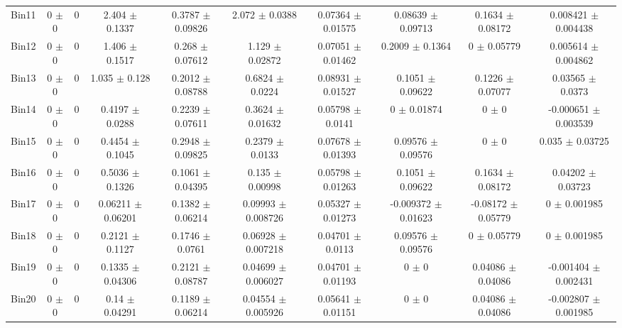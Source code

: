 \begin{tabular}{@{\extracolsep{4pt}}lccccccccc@{}}
     Bin11 & 0 $\pm$ 0 & 0 & 2.404 $\pm$ 0.1337 & 0.3787 $\pm$ 0.09826 & 2.072 $\pm$ 0.0388 & 0.07364 $\pm$ 0.01575 & 0.08639 $\pm$ 0.09713 & 0.1634 $\pm$ 0.08172 & 0.008421 $\pm$ 0.004438 \\ 
     Bin12 & 0 $\pm$ 0 & 0 & 1.406 $\pm$ 0.1517 & 0.268 $\pm$ 0.07612 & 1.129 $\pm$ 0.02872 & 0.07051 $\pm$ 0.01462 & 0.2009 $\pm$ 0.1364 & 0 $\pm$ 0.05779 & 0.005614 $\pm$ 0.004862 \\ 
     Bin13 & 0 $\pm$ 0 & 0 & 1.035 $\pm$ 0.128 & 0.2012 $\pm$ 0.08788 & 0.6824 $\pm$ 0.0224 & 0.08931 $\pm$ 0.01527 & 0.1051 $\pm$ 0.09622 & 0.1226 $\pm$ 0.07077 & 0.03565 $\pm$ 0.0373 \\ 
     Bin14 & 0 $\pm$ 0 & 0 & 0.4197 $\pm$ 0.0288 & 0.2239 $\pm$ 0.07611 & 0.3624 $\pm$ 0.01632 & 0.05798 $\pm$ 0.0141 & 0 $\pm$ 0.01874 & 0 $\pm$ 0 & -0.000651 $\pm$ 0.003539 \\ 
     Bin15 & 0 $\pm$ 0 & 0 & 0.4454 $\pm$ 0.1045 & 0.2948 $\pm$ 0.09825 & 0.2379 $\pm$ 0.0133 & 0.07678 $\pm$ 0.01393 & 0.09576 $\pm$ 0.09576 & 0 $\pm$ 0 & 0.035 $\pm$ 0.03725 \\ 
     Bin16 & 0 $\pm$ 0 & 0 & 0.5036 $\pm$ 0.1326 & 0.1061 $\pm$ 0.04395 & 0.135 $\pm$ 0.00998 & 0.05798 $\pm$ 0.01263 & 0.1051 $\pm$ 0.09622 & 0.1634 $\pm$ 0.08172 & 0.04202 $\pm$ 0.03723 \\ 
     Bin17 & 0 $\pm$ 0 & 0 & 0.06211 $\pm$ 0.06201 & 0.1382 $\pm$ 0.06214 & 0.09993 $\pm$ 0.008726 & 0.05327 $\pm$ 0.01273 & -0.009372 $\pm$ 0.01623 & -0.08172 $\pm$ 0.05779 & 0 $\pm$ 0.001985 \\ 
     Bin18 & 0 $\pm$ 0 & 0 & 0.2121 $\pm$ 0.1127 & 0.1746 $\pm$ 0.0761 & 0.06928 $\pm$ 0.007218 & 0.04701 $\pm$ 0.0113 & 0.09576 $\pm$ 0.09576 & 0 $\pm$ 0.05779 & 0 $\pm$ 0.001985 \\ 
     Bin19 & 0 $\pm$ 0 & 0 & 0.1335 $\pm$ 0.04306 & 0.2121 $\pm$ 0.08787 & 0.04699 $\pm$ 0.006027 & 0.04701 $\pm$ 0.01193 & 0 $\pm$ 0 & 0.04086 $\pm$ 0.04086 & -0.001404 $\pm$ 0.002431 \\ 
     Bin20 & 0 $\pm$ 0 & 0 & 0.14 $\pm$ 0.04291 & 0.1189 $\pm$ 0.06214 & 0.04554 $\pm$ 0.005926 & 0.05641 $\pm$ 0.01151 & 0 $\pm$ 0 & 0.04086 $\pm$ 0.04086 & -0.002807 $\pm$ 0.001985 \\ 
\hline\hline
  \end{tabular}
